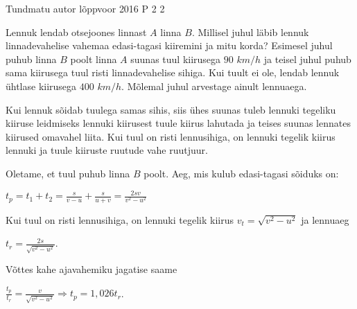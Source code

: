 {Tundmatu autor} %
{lõppvoor} %
{2016} %
{P 2} %
{2} %
{

\ifStatement
Lennuk lendab otsejoones linnast $A$ linna $B$. Millisel juhul läbib lennuk linnadevahelise vahemaa edasi-tagasi kiiremini ja mitu korda? Esimesel juhul puhub linna $B$ poolt linna $A$ suunas tuul kiirusega $90$ $km/h$ ja teisel juhul puhub sama kiirusega tuul risti linnadevahelise sihiga. Kui tuult ei ole, lendab lennuk ühtlase kiirusega $400$ $km/h$. Mõlemal juhul arvestage ainult lennuaega.
\fi


\ifHint
Kui lennuk sõidab tuulega samas sihis, siis ühes suunas tuleb lennuki tegeliku kiiruse leidmiseks lennuki kiirusest tuule kiirus lahutada ja teises suunas lennates kiirused omavahel liita. Kui tuul on risti lennusihiga, on lennuki tegelik kiirus lennuki ja tuule kiiruste ruutude vahe ruutjuur.
\fi

\ifSolution
Oletame, et tuul puhub linna $B$ poolt. Aeg, mis kulub edasi-tagasi sõiduks on:
\begin{center}
$t_p = t_1 + t_2 = \frac{s}{v - u} + \frac{s}{u + v} = \frac{2sv}{v^2 - u^2}$
\end{center}
Kui tuul on risti lennusihiga, on lennuki tegelik kiirus $v_t = \sqrt{v^2 - u^2}$ ja lennuaeg
\begin{center}
$t_r = \frac{2s}{\sqrt{v^2 - u^2}}$.
\end{center}
Võttes kahe ajavahemiku jagatise saame
\begin{center}
$\frac{t_p}{t_r} = \frac{v}{\sqrt{v^2 - u^2}} \Rightarrow t_p = 1,026t_r$.
\end{center}
\fi
}